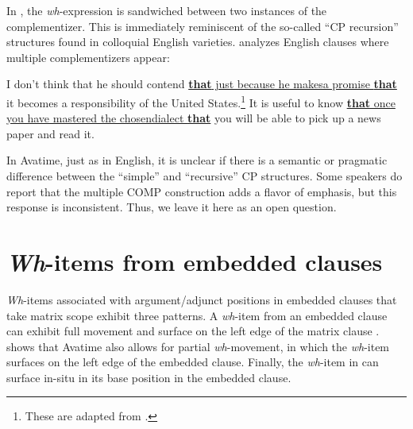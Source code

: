 \documentclass[output=paper]{langscibook}
\begin{document}
In , the \textit{wh}-expression is sandwiched between two instances of the complementizer.  This is immediately reminiscent of the so-called ``CP recursion” structures  found in colloquial English varieties.  \citet{mccloskey2006questions} analyzes English clauses where multiple complementizers appear:


\ea
\begin{xlist}
\ex 
I don’t think that he should contend \uline{\textbf{that} just because he makes}\newline \uline{a promise \textbf{that}} it becomes a responsibility of the United States.\footnote{These are adapted from \citet[(69d) and (69e)]{mccloskey2006questions}.}
\ex 
It is useful to know \uline{\textbf{that} once you have mastered the chosen}\newline \uline{dialect \textbf{that}} you will be able to pick up a news paper and read it.
\end{xlist}
\z

In Avatime, just as in English, it is unclear if there is a semantic or pragmatic difference between the ``simple'' and ``recursive'' CP structures.  Some speakers do report that the multiple COMP construction adds a flavor of emphasis, but this response is inconsistent.  Thus, we leave it here as an open question.

\section{\textit{Wh}-items from embedded clauses}
\textit{Wh}-items associated with argument/adjunct positions in embedded clauses that take matrix scope exhibit three patterns. A \textit{wh}-item from an embedded clause can exhibit full movement and surface on the left edge of the matrix clause .  shows that Avatime also allows for partial \textit{wh}-movement, in which the \textit{wh}-item surfaces on the left edge of the embedded clause.  Finally, the \textit{wh}-item in  can surface in-situ in its base position in the embedded clause.
\end{document}
